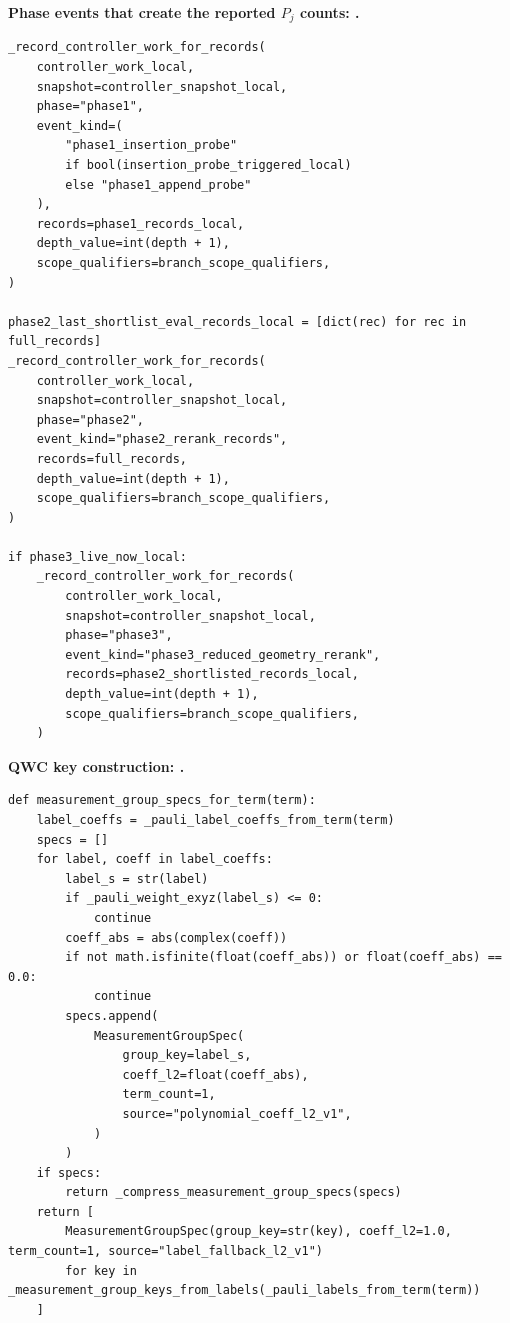 \documentclass[10pt,twocolumn]{article}
\begin{document}
\textbf{\footnotesize Phase events that create the reported \(P_j\) counts:
.}
\begin{lstlisting}
_record_controller_work_for_records(
    controller_work_local,
    snapshot=controller_snapshot_local,
    phase="phase1",
    event_kind=(
        "phase1_insertion_probe"
        if bool(insertion_probe_triggered_local)
        else "phase1_append_probe"
    ),
    records=phase1_records_local,
    depth_value=int(depth + 1),
    scope_qualifiers=branch_scope_qualifiers,
)

phase2_last_shortlist_eval_records_local = [dict(rec) for rec in full_records]
_record_controller_work_for_records(
    controller_work_local,
    snapshot=controller_snapshot_local,
    phase="phase2",
    event_kind="phase2_rerank_records",
    records=full_records,
    depth_value=int(depth + 1),
    scope_qualifiers=branch_scope_qualifiers,
)

if phase3_live_now_local:
    _record_controller_work_for_records(
        controller_work_local,
        snapshot=controller_snapshot_local,
        phase="phase3",
        event_kind="phase3_reduced_geometry_rerank",
        records=phase2_shortlisted_records_local,
        depth_value=int(depth + 1),
        scope_qualifiers=branch_scope_qualifiers,
    )
\end{lstlisting}

\textbf{\footnotesize QWC key construction:
.}
\begin{lstlisting}
def measurement_group_specs_for_term(term):
    label_coeffs = _pauli_label_coeffs_from_term(term)
    specs = []
    for label, coeff in label_coeffs:
        label_s = str(label)
        if _pauli_weight_exyz(label_s) <= 0:
            continue
        coeff_abs = abs(complex(coeff))
        if not math.isfinite(float(coeff_abs)) or float(coeff_abs) == 0.0:
            continue
        specs.append(
            MeasurementGroupSpec(
                group_key=label_s,
                coeff_l2=float(coeff_abs),
                term_count=1,
                source="polynomial_coeff_l2_v1",
            )
        )
    if specs:
        return _compress_measurement_group_specs(specs)
    return [
        MeasurementGroupSpec(group_key=str(key), coeff_l2=1.0, term_count=1, source="label_fallback_l2_v1")
        for key in _measurement_group_keys_from_labels(_pauli_labels_from_term(term))
    ]
\end{lstlisting}
\end{document}
